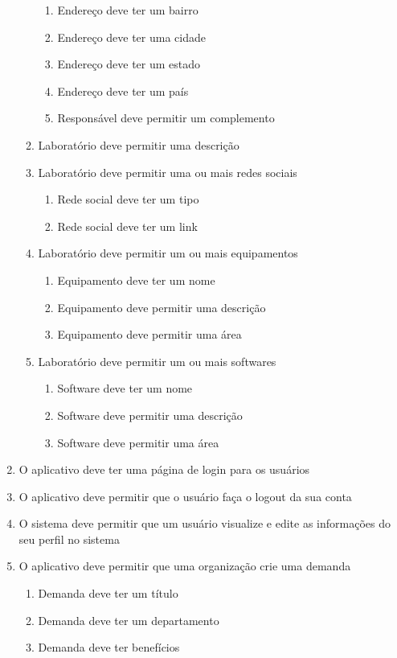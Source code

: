 \begin{enumerate}
\begin{enumerate}
\begin{enumerate}
			\item Endereço deve ter um bairro
			\item Endereço deve ter uma cidade
			\item Endereço deve ter um estado
			\item Endereço deve ter um país
			\item Responsável deve permitir um complemento
		\end{enumerate}
		\item Laboratório deve permitir uma descrição
		\item Laboratório deve permitir uma ou mais redes sociais
		\begin{enumerate}
			\item Rede social deve ter um tipo
			\item Rede social deve ter um link
		\end{enumerate}
		\item Laboratório deve permitir um ou mais equipamentos
		\begin{enumerate}
			\item Equipamento deve ter um nome
			\item Equipamento deve permitir uma descrição
			\item Equipamento deve permitir uma área
		\end{enumerate}
		\item Laboratório deve permitir um ou mais softwares
		\begin{enumerate}
			\item Software deve ter um nome
			\item Software deve permitir uma descrição
			\item Software deve permitir uma área
		\end{enumerate}
	\end{enumerate}
    \item O aplicativo deve ter uma página de login para os usuários
    \item O aplicativo deve permitir que o usuário faça o logout da sua conta
    \item O sistema deve permitir que um usuário visualize e edite as informações do seu perfil no sistema
    \item O aplicativo deve permitir que uma organização crie uma demanda
	\begin{enumerate}
		\item Demanda deve ter um título
		\item Demanda deve ter um departamento
		\item Demanda deve ter benefícios

\end{enumerate}
\end{enumerate}
